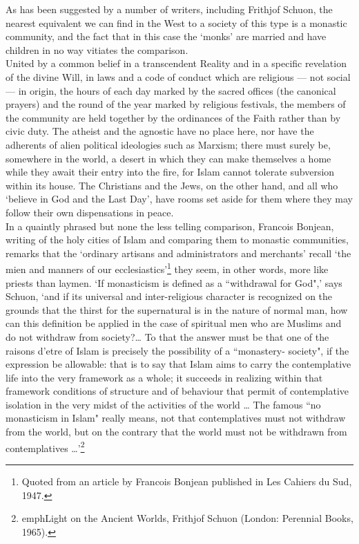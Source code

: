 \documentclass[10pt, twoside,openright]{book}
\begin{document}
As has been suggested by a number of writers, including Frithjof Schuon, the nearest equivalent we 
can find in the West to a society of this type is a monastic community, and the fact that in this 
case the `monks' are married and have children in no way vitiates the comparison. \\

United by a common belief in a transcendent Reality and in a specific revelation of the divine Will, 
in laws and a code of conduct which are religious --- not social --- in origin, the hours of each day 
marked by the sacred offices (the canonical prayers) and the round of the year marked by religious 
festivals, the members of the community are held together by the ordinances of the Faith rather than 
by civic duty. The atheist and the agnostic have no place here, nor have the adherents of alien 
political ideologies such as Marxism; there must surely be, somewhere in the world, a desert in which 
they can make themselves a home while they await their entry into the fire, for Islam cannot tolerate 
subversion within its house. The Christians and the Jews, on the other hand, and all who `believe in 
God and the Last Day', have rooms set aside for them where they may follow their own dispensations in 
peace. \\

In a quaintly phrased but none the less telling comparison, Francois Bonjean, writing of the holy 
cities of Islam and comparing them to monastic communities, remarks that the `ordinary artisans and 
administrators and merchants' recall `the mien and manners of our ecclesiastics'\footnote{Quoted from an article by Francois Bonjean published in Les Cahiers du Sud, 1947.} they seem, in 
other words, more like priests than laymen. `If monasticism is defined as a ``withdrawal for God",' 
says Schuon, `and if its universal and inter\hyp{}religious character is recognized on the grounds that 
the thirst for the supernatural is in the nature of normal man, how can this definition be applied in 
the case of spiritual men who are Muslims and do not withdraw from society?\ldots{} To that the answer 
must be that one of the raisons d'etre of Islam is precisely the possibility of a ``monastery\hyp{}
society", if the expression be allowable: that is to say that Islam aims to carry the contemplative 
life into the very framework as a whole; it succeeds in realizing within that framework conditions of 
structure and of behaviour that permit of contemplative isolation in the very midst of the activities 
of the world \ldots{} The famous ``no monasticism in Islam" really means, not that contemplatives must not 
withdraw from the world, but on the contrary that the world must not be withdrawn from contemplatives 
\ldots{}'\footnote{emph{Light on the Ancient Worlds}, Frithjof Schuon (London: Perennial Books, 1965).}
\end{document}
